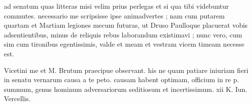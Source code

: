 


 ad senatum quas litteras misi velim prius perlegas et si qua tibi videbuntur commutes. necessario me scripsisse ipse animadvertes ; nam cum putarem quartam et Martiam legiones mecum futuras, ut Druso Paulloque placuerat vobis adsentientibus, minus de reliquis rebus laborandum existimavi ; nunc vero, cum sim cum tironibus egentissimis, valde et meam et vestram vicem timeam necesse est.

 Vicetini me et M. Brutum praecipue observant. his ne quam patiare iniuriam fieri in senatu vernarum causa a te peto. causam habent optimam, officium in re p. summum, genus hominum adversariorum seditiosum et incertissimum. xii K. Iun. Vercellis.
